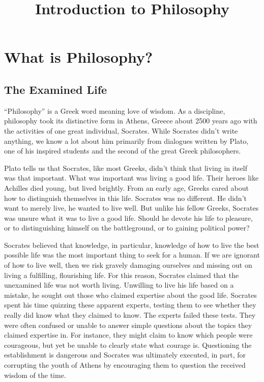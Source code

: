 \documentclass[]{article}
\title{Introduction to Philosophy}
\date{}
\begin{document}
\maketitle

\section{What is Philosophy?}\label{what-is-philosophy}

\subsection{The Examined Life}\label{the-examined-life}

``Philosophy'' is a Greek word meaning love of wisdom. As a discipline,
philosophy took its distinctive form in Athens, Greece about 2500 years
ago with the activities of one great individual, Socrates. While
Socrates didn't write anything, we know a lot about him primarily from
dialogues written by Plato, one of his inspired students and the second
of the great Greek philosophers.

Plato tells us that Socrates, like most Greeks, didn't think that living
in itself was that important. What was important was living a good life.
Their heroes like Achilles died young, but lived brightly. From an early
age, Greeks cared about how to distinguish themselves in this life.
Socrates was no different. He didn't want to merely live, he wanted to
live well. But unlike his fellow Greeks, Socrates was unsure what it was
to live a good life. Should he devote his life to pleasure, or to
distinguishing himself on the battleground, or to gaining political
power?

Socrates believed that knowledge, in particular, knowledge of how to
live the best possible life was the most important thing to seek for a
human. If we are ignorant of how to live well, then we risk gravely
damaging ourselves and missing out on living a fulfilling, flourishing
life. For this reason, Socrates claimed that the unexamined life was not
worth living. Unwilling to live his life based on a mistake, he sought
out those who claimed expertise about the good life. Socrates spent his
time quizzing these apparent experts, testing them to see whether they
really did know what they claimed to know. The experts failed these
tests. They were often confused or unable to answer simple questions
about the topics they claimed expertise in. For instance, they might
claim to know which people were courageous, but yet be unable to clearly
state what courage is. Questioning the establishment is dangerous and
Socrates was ultimately executed, in part, for corrupting the youth of
Athens by encouraging them to question the received wisdom of the time.
\end{document}
